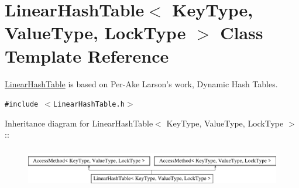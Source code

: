 \hypertarget{classLinearHashTable}{
\section{LinearHashTable$<$ KeyType, ValueType, LockType $>$ Class Template Reference}
\label{classLinearHashTable}
}
\hyperlink{classLinearHashTable}{LinearHashTable} is based on Per-Ake Larson's work, Dynamic Hash Tables.  


{\tt \#include $<$LinearHashTable.h$>$}

Inheritance diagram for LinearHashTable$<$ KeyType, ValueType, LockType $>$::\begin{figure}[H]
\begin{center}
\leavevmode
\includegraphics[height=1.7284cm]{classLinearHashTable}
\end{center}
\end{figure}
